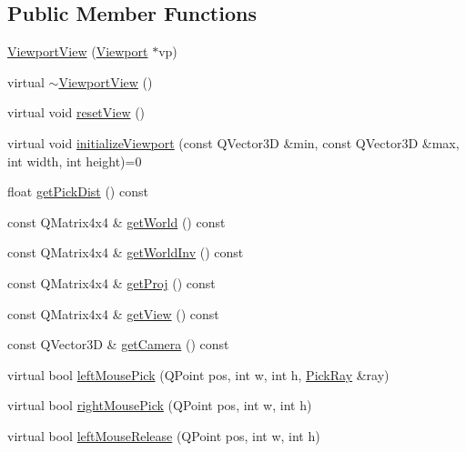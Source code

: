 \subsection*{Public Member Functions}
\begin{DoxyCompactItemize}
\item 
\hyperlink{classShipCAD_1_1ViewportView_a725088d3f0e113c97ae52cccab7fce42}{Viewport\+View} (\hyperlink{classShipCAD_1_1Viewport}{Viewport} $\ast$vp)
\item 
virtual \hyperlink{classShipCAD_1_1ViewportView_a75f58efbb601f46ea20b70b1370cee1a}{$\sim$\+Viewport\+View} ()
\item 
virtual void \hyperlink{classShipCAD_1_1ViewportView_ab70e778772325a67610d983f630c2c3d}{reset\+View} ()
\item 
virtual void \hyperlink{classShipCAD_1_1ViewportView_ad1c89a6e34b7b3795a7f21e67181dc0f}{initialize\+Viewport} (const Q\+Vector3D \&min, const Q\+Vector3D \&max, int width, int height)=0
\item 
float \hyperlink{classShipCAD_1_1ViewportView_a69e218b17f56faac4fb02fec6ac9c5fb}{get\+Pick\+Dist} () const 
\item 
const Q\+Matrix4x4 \& \hyperlink{classShipCAD_1_1ViewportView_a0be1613b2ae2087da00811f2bdb0bd45}{get\+World} () const 
\item 
const Q\+Matrix4x4 \& \hyperlink{classShipCAD_1_1ViewportView_a6bffec9328b29bf40c868f2862daebe0}{get\+World\+Inv} () const 
\item 
const Q\+Matrix4x4 \& \hyperlink{classShipCAD_1_1ViewportView_af87bb73f78d5393d013708542eb184ae}{get\+Proj} () const 
\item 
const Q\+Matrix4x4 \& \hyperlink{classShipCAD_1_1ViewportView_a7e3e335818a369e64989f20d7a8dda4f}{get\+View} () const 
\item 
const Q\+Vector3D \& \hyperlink{classShipCAD_1_1ViewportView_a33150e3f757ddbbe045d7d046b4862e5}{get\+Camera} () const 
\item 
virtual bool \hyperlink{classShipCAD_1_1ViewportView_a4c2e113c5c0e58bb72576a8a802f5a29}{left\+Mouse\+Pick} (Q\+Point pos, int w, int h, \hyperlink{structShipCAD_1_1PickRay}{Pick\+Ray} \&ray)
\item 
virtual bool \hyperlink{classShipCAD_1_1ViewportView_a1e67e403d7307d3828336edbc1ded2f3}{right\+Mouse\+Pick} (Q\+Point pos, int w, int h)
\item 
virtual bool \hyperlink{classShipCAD_1_1ViewportView_ad74e96e8fef750466b2771f8fc48900a}{left\+Mouse\+Release} (Q\+Point pos, int w, int h)
\item 

\end{DoxyCompactItemize}
